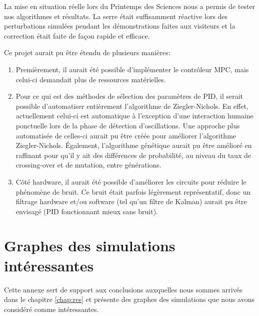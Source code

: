 \documentclass[a4paper,10pt]{report}
\begin{document}
La mise en situation réelle lors du Printemps des Sciences nous a permis de tester nos algorithmes et résultats. La serre était suffisamment réactive lors des perturbations simulées pendant les démonstrations faites aux visiteurs et la correction était faite de façon rapide et efficace.

Ce projet aurait pu être étendu de plusieurs manières:

\begin{enumerate}
\item Premièrement, il aurait été possible d'implémenter le contrôleur MPC, mais celui-ci demandait plus de ressources matérielles.
\item Pour ce qui est des méthodes de sélection des paramètres de PID, il serait possible d'automatiser entièrement l'algorithme de Ziegler-Nichols. En effet, actuellement celui-ci est automatique à l'exception d'une interaction humaine ponctuelle lors de la phase de détection d'oscillations. Une approche plus automatisée de celles-ci aurait pu être créée pour améliorer l'algorithme Ziegler-Nichols. Également, l'algorithme génétique aurait pu être amélioré en raffinant pour qu'il y ait des différences de probabilité, au niveau du taux de crossing-over et de mutation, entre générations.
\item Côté hardware, il aurait été possible d'améliorer les circuits pour réduire le phénomène de bruit. Ce bruit était parfois légèrement représentatif, donc un filtrage hardware et/ou software (tel qu'un filtre de Kalman) aurait pu être envisagé (PID fonctionnant mieux sans bruit).
\end{enumerate}






\appendix

\chapter{Graphes des simulations intéressantes}


Cette annexe sert de support aux conclusions auxquelles nous sommes arrivés dans le chapitre \ref{chap:res} et présente des graphes des simulations que nous avons considéré comme intéressantes.
\end{document}
